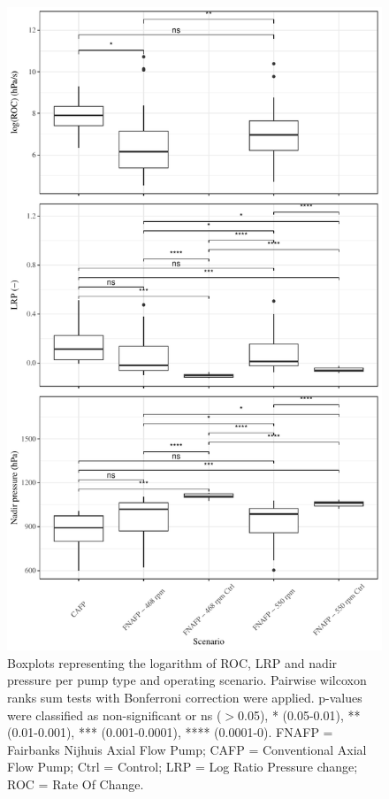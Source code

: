 \documentclass[fleqn,10pt]{wlscirep}
\begin{document}
\begin{figure}[ht]
  \centering
  \includegraphics[scale=0.7]{BDS_boxplots}
  \caption{Boxplots representing the logarithm of ROC, LRP and nadir pressure per pump type and operating scenario. Pairwise wilcoxon ranks sum tests with Bonferroni correction were applied. p-values were classified as non-significant or ns ($>$0.05), * (0.05-0.01), ** (0.01-0.001), *** (0.001-0.0001), **** (0.0001-0). FNAFP = Fairbanks Nijhuis Axial Flow Pump; CAFP = Conventional Axial Flow Pump; Ctrl = Control; LRP = Log Ratio Pressure change; ROC = Rate Of Change.}
  \label{fig:BDS_boxplots}
\end{figure}
\end{document}
